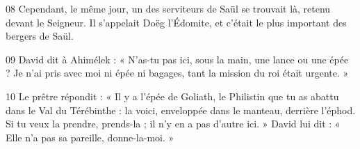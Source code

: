 

08 Cependant, le même jour, un des serviteurs de Saül se trouvait là, retenu devant le Seigneur. Il s’appelait Doëg l’Édomite, et c’était le plus important des bergers de Saül.

09 David dit à Ahimélek : « N’as-tu pas ici, sous la main, une lance ou une épée ? Je n’ai pris avec moi ni épée ni bagages, tant la mission du roi était urgente. »

10 Le prêtre répondit : « Il y a l’épée de Goliath, le Philistin que tu as abattu dans le Val du Térébinthe : la voici, enveloppée dans le manteau, derrière l’éphod. Si tu veux la prendre, prends-la ; il n’y en a pas d’autre ici. » David lui dit : « Elle n’a pas sa pareille, donne-la-moi. »

